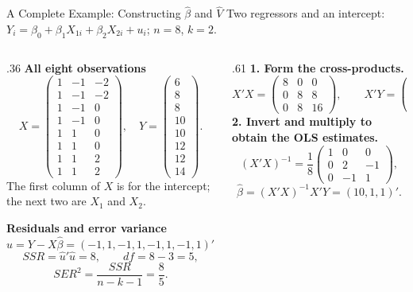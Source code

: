 \documentclass[notes,10pt, aspectratio=169]{beamer}
\begin{document}
\begin{frame}{A Complete Example: Constructing $\hat\beta$ and $\widehat V$}
\footnotesize
\setlength{\abovedisplayskip}{4pt}
\setlength{\belowdisplayskip}{4pt}
Two regressors and an intercept: $Y_i=\beta_0+\beta_1X_{1i}+\beta_2X_{2i}+u_i$; $n=8$, $k=2$.
\par\medskip
\begin{columns}[T]
\begin{column}{.36\textwidth}
\textbf{All eight observations}
\[
X=\begin{pmatrix}
1&-1&-2\\
1&-1&-2\\
1&-1&0\\
1&-1&0\\
1&1&0\\
1&1&0\\
1&1&2\\
1&1&2
\end{pmatrix},\quad
Y=\begin{pmatrix}6\\8\\8\\10\\10\\12\\12\\14\end{pmatrix}.
\]
The first column of $X$ is for the intercept; the next two are $X_1$ and $X_2$.
\par\medskip
\textbf{Residuals and error variance}
\[
\hat u=Y-X\hat\beta=(-1,1,-1,1,-1,1,-1,1)'.
\]
\[
SSR=\hat u'\hat u=8,\qquad df=8-3=5,
\]
\[
SER^2=\frac{SSR}{n-k-1}=\frac85.
\]
\end{column}
\begin{column}{.61\textwidth}
\textbf{1. Form the cross-products.}
\[
X'X=\begin{pmatrix}8&0&0\\0&8&8\\0&8&16\end{pmatrix},\qquad
X'Y=\begin{pmatrix}80\\16\\24\end{pmatrix}.
\]
\textbf{2. Invert and multiply to obtain the OLS estimates.}
\[
(X'X)^{-1}=\frac18\begin{pmatrix}1&0&0\\0&2&-1\\0&-1&1\end{pmatrix},
\]
\[
\hat\beta=(X'X)^{-1}X'Y=(10,1,1)'.
\]
\end{column}
\end{columns}
\end{frame}
\end{document}
